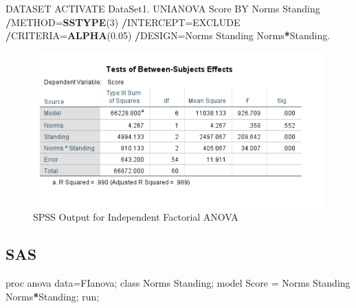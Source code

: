 \documentclass[
]{book}
\newenvironment{Shaded}{\begin{snugshade}}{\end{snugshade}}
\newcommand{\DecValTok}[1]{\textcolor[rgb]{0.00,0.00,0.81}{#1}}
\newcommand{\FloatTok}[1]{\textcolor[rgb]{0.00,0.00,0.81}{#1}}
\newcommand{\KeywordTok}[1]{\textcolor[rgb]{0.13,0.29,0.53}{\textbf{#1}}}
\newcommand{\NormalTok}[1]{#1}
\newcommand{\OperatorTok}[1]{\textcolor[rgb]{0.81,0.36,0.00}{\textbf{#1}}}
\newcommand{\StringTok}[1]{\textcolor[rgb]{0.31,0.60,0.02}{#1}}
\begin{document}
\begin{Shaded}
\begin{Highlighting}[]
\NormalTok{DATASET ACTIVATE DataSet1.}
\NormalTok{UNIANOVA Score BY Norms Standing}
  \OperatorTok{/}\NormalTok{METHOD=}\KeywordTok{SSTYPE}\NormalTok{(}\DecValTok{3}\NormalTok{)}
  \OperatorTok{/}\NormalTok{INTERCEPT=EXCLUDE}
  \OperatorTok{/}\NormalTok{CRITERIA=}\KeywordTok{ALPHA}\NormalTok{(}\FloatTok{0.05}\NormalTok{)}
  \OperatorTok{/}\NormalTok{DESIGN=Norms Standing Norms}\OperatorTok{*}\NormalTok{Standing.}
\end{Highlighting}
\end{Shaded}

\begin{figure}[!h]
\includegraphics{Screenshots/Factorial Independent ANOVA/FIanovaSPSS} \caption{\label{fig:FIanovaSPSS}SPSS Output for Independent Factorial ANOVA}\label{fig:FIanovaSPSS}
\end{figure}

\hypertarget{sas-1}{%
\subsection{SAS}\label{sas-1}}

\begin{Shaded}
\begin{Highlighting}[]
\NormalTok{proc anova data=FIanova;}
\NormalTok{      class Norms Standing;}
\NormalTok{	  model Score =}\StringTok{ }\NormalTok{Norms Standing Norms}\OperatorTok{*}\NormalTok{Standing;}
\NormalTok{   run;}
\end{Highlighting}
\end{Shaded}
\end{document}
